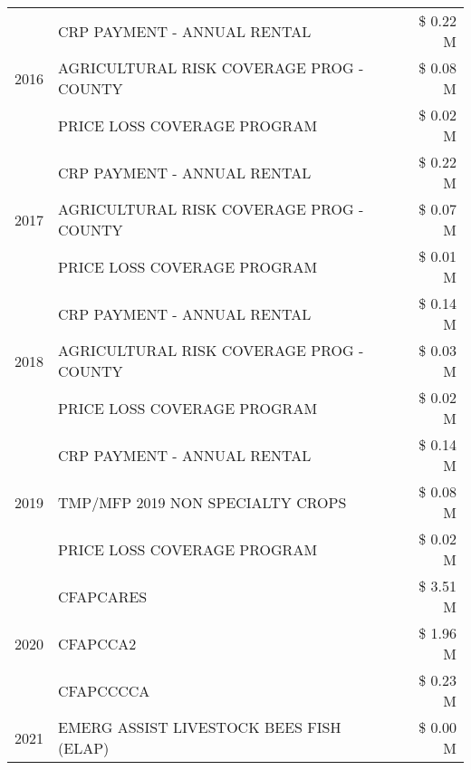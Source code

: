 \begin{tabular}{llr}
\cline{1-3}
\multirow[t]{3}{*}{2016} & CRP PAYMENT - ANNUAL RENTAL & \$ 0.22 M \\
 & AGRICULTURAL RISK COVERAGE PROG - COUNTY & \$ 0.08 M \\
 & PRICE LOSS COVERAGE PROGRAM & \$ 0.02 M \\
\cline{1-3}
\multirow[t]{3}{*}{2017} & CRP PAYMENT - ANNUAL RENTAL & \$ 0.22 M \\
 & AGRICULTURAL RISK COVERAGE PROG - COUNTY & \$ 0.07 M \\
 & PRICE LOSS COVERAGE PROGRAM & \$ 0.01 M \\
\cline{1-3}
\multirow[t]{3}{*}{2018} & CRP PAYMENT - ANNUAL RENTAL & \$ 0.14 M \\
 & AGRICULTURAL RISK COVERAGE PROG - COUNTY & \$ 0.03 M \\
 & PRICE LOSS COVERAGE PROGRAM & \$ 0.02 M \\
\cline{1-3}
\multirow[t]{3}{*}{2019} & CRP PAYMENT - ANNUAL RENTAL & \$ 0.14 M \\
 & TMP/MFP 2019 NON SPECIALTY CROPS & \$ 0.08 M \\
 & PRICE LOSS COVERAGE PROGRAM & \$ 0.02 M \\
\cline{1-3}
\multirow[t]{3}{*}{2020} & CFAPCARES & \$ 3.51 M \\
 & CFAPCCA2 & \$ 1.96 M \\
 & CFAPCCCCA & \$ 0.23 M \\
\cline{1-3}
2021 & EMERG ASSIST LIVESTOCK BEES FISH (ELAP) & \$ 0.00 M \\
\cline{1-3}
\bottomrule
\end{tabular}
